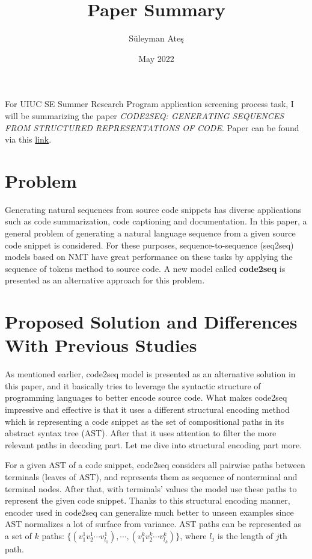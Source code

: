 \documentclass[11pt]{article}
\author{Süleyman Ateş}
\date{May 2022}
\title{Paper Summary}
\begin{document}
\maketitle

For UIUC SE Summer Research Program application screening process task, I will be summarizing the paper \textit{CODE2SEQ: GENERATING SEQUENCES FROM STRUCTURED REPRESENTATIONS OF CODE}. Paper can be found via this \href{https://arxiv.org/pdf/1808.01400.pdf}{link}.

\section{Problem}

Generating natural sequences from source code snippets has diverse applications such as code summarization, code captioning and documentation. In this paper, a general problem of generating a natural language sequence from a given source code snippet is considered. For these purposes, sequence-to-sequence (seq2seq) models based on NMT have great performance on these tasks by applying the sequence of tokens method to source code. A new model called \textbf{code2seq} is presented as an alternative approach for this problem.

\section{Proposed Solution and Differences With Previous Studies}

As mentioned earlier, code2seq model is presented as an alternative solution in this paper, and it basically tries to leverage the syntactic structure of programming languages to better encode source code. What makes code2seq impressive and effective is that it uses a different structural encoding method which is representing a code snippet as the set of compositional paths in its abstract syntax tree (AST). After that it uses attention to filter the more relevant paths in decoding part. Let me dive into structural encoding part more.

For a given AST of a code snippet, code2seq considers all pairwise paths between terminals (leaves of AST), and represents them as sequence of nonterminal and terminal nodes. After that, with terminals' values the model use these paths to represent the given code snippet. Thanks to this structural encoding manner, encoder used in code2seq can generalize much better to unseen examples since AST normalizes a lot of surface from variance. AST paths can be represented as a set of $k$ paths: $\{(v_{1}^1 v_{2}^1 \cdots v_{l_1}^1), \cdots, (v_{1}^k v_{2}^k \cdots v_{l_k}^k)\}$, where $l_j$ is the length of $j$th path.
\end{document}

